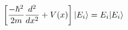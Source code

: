 \begin{equation}
  \left[\frac{-\hbar^2}{2m}\frac{d^2}{dx^2}+V(x)\right]\lvert E_i\rangle = E_i \lvert E_i\rangle
\end{equation}






